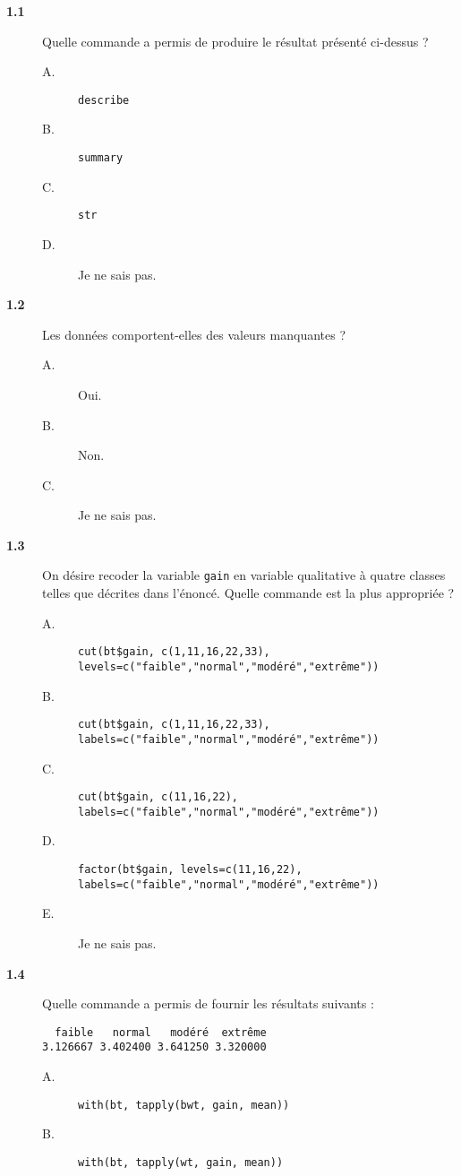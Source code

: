 \documentclass[11pt]{report}
\theoremstyle{definition}
\begin{document}
\begin{description}
\item[\bf 1.1]  Quelle commande a permis de
  produire le résultat présenté ci-dessus ?
  \begin{description}
  \item[A.] \verb|describe|
  \item[B.] \verb|summary|
  \item[C.] \verb|str|
  \item[D.] Je ne sais pas.
  \end{description}
\item[\bf 1.2]  Les données comportent-elles des
  valeurs manquantes ?
  \begin{description}
  \item[A.] Oui.
  \item[B.] Non.
  \item[C.] Je ne sais pas.
  \end{description}
\item[\bf 1.3]  On désire recoder la variable
  \texttt{gain} en variable qualitative à quatre classes telles que décrites
  dans l'énoncé. Quelle commande est la plus appropriée ?
  \begin{description}
  \item[A.] \verb|cut(bt$gain, c(1,11,16,22,33), levels=c("faible","normal","modéré","extrême"))|
  \item[B.] \verb|cut(bt$gain, c(1,11,16,22,33), labels=c("faible","normal","modéré","extrême"))|
  \item[C.] \verb|cut(bt$gain, c(11,16,22), labels=c("faible","normal","modéré","extrême"))|
  \item[D.] \verb|factor(bt$gain, levels=c(11,16,22), labels=c("faible","normal","modéré","extrême"))|
  \item[E.] Je ne sais pas.
  \end{description}  
\item[\bf 1.4]  Quelle commande a permis de fournir
  les résultats suivants :
\begin{verbatim}
  faible   normal   modéré  extrême 
3.126667 3.402400 3.641250 3.320000
\end{verbatim}
  \begin{description}
  \item[A.] \verb|with(bt, tapply(bwt, gain, mean))|
  \item[B.] \verb|with(bt, tapply(wt, gain, mean))|

\end{description}
\end{description}
\end{document}
